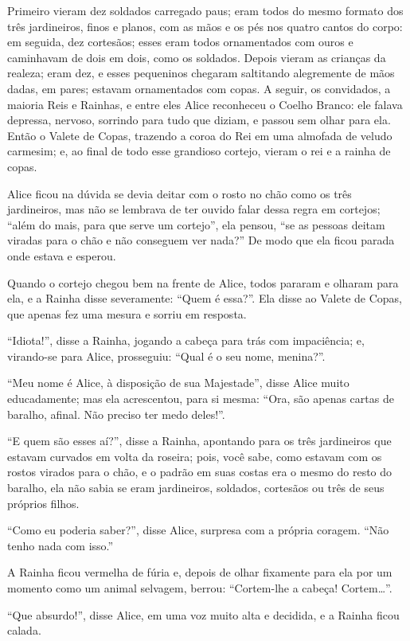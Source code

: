 Primeiro vieram dez soldados carregado paus; eram todos do mesmo formato
dos três jardineiros, finos e planos, com as mãos e os pés nos quatro
cantos do corpo: em seguida, dez cortesãos; esses eram todos
ornamentados com ouros e caminhavam de dois em dois, como os soldados.
Depois vieram as crianças da realeza; eram dez, e esses pequeninos
chegaram saltitando alegremente de mãos dadas, em pares; estavam
ornamentados com copas. A seguir, os convidados, a maioria Reis e
Rainhas, e entre eles Alice reconheceu o Coelho Branco: ele falava
depressa, nervoso, sorrindo para tudo que diziam, e passou sem olhar
para ela. Então o Valete de Copas, trazendo a coroa do Rei em uma
almofada de veludo carmesim; e, ao final de todo esse grandioso cortejo,
vieram o rei e a rainha de copas.

Alice ficou na dúvida se devia deitar com o rosto no chão como os três
jardineiros, mas não se lembrava de ter ouvido falar dessa regra em
cortejos; ``além do mais, para que serve um cortejo'', ela pensou, ``se
as pessoas deitam viradas para o chão e não conseguem ver nada?'' De
modo que ela ficou parada onde estava e esperou.

Quando o cortejo chegou bem na frente de Alice, todos pararam e olharam
para ela, e a Rainha disse severamente: ``Quem é essa?''. Ela disse ao
Valete de Copas, que apenas fez uma mesura e sorriu em resposta.

``Idiota!'', disse a Rainha, jogando a cabeça para trás com impaciência;
e, virando-se para Alice, prosseguiu: ``Qual é o seu nome, menina?''.

``Meu nome é Alice, à disposição de sua Majestade'', disse Alice muito
educadamente; mas ela acrescentou, para si mesma: ``Ora, são apenas
cartas de baralho, afinal. Não preciso ter medo deles!''.

``E quem são esses aí?'', disse a Rainha, apontando para os três
jardineiros que estavam curvados em volta da roseira; pois, você sabe,
como estavam com os rostos virados para o chão, e o padrão em suas
costas era o mesmo do resto do baralho, ela não sabia se eram
jardineiros, soldados, cortesãos ou três de seus próprios filhos.

``Como eu poderia saber?'', disse Alice, surpresa com a própria coragem.
``Não tenho nada com isso.''

A Rainha ficou vermelha de fúria e, depois de olhar fixamente para ela
por um momento como um animal selvagem, berrou: ``Cortem-lhe a cabeça!
Cortem\ldots{}''.

``Que absurdo!'', disse Alice, em uma voz muito alta e decidida, e a Rainha
ficou calada.

